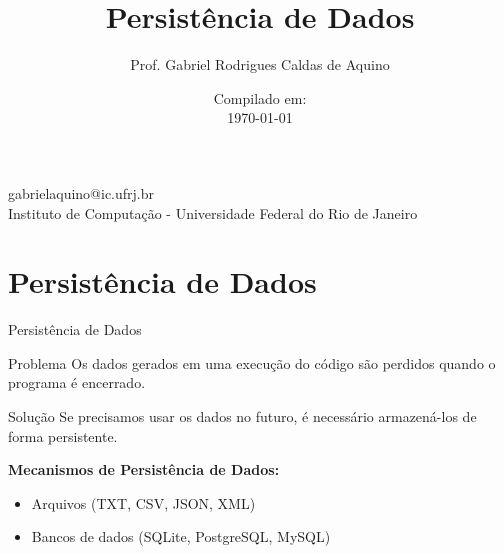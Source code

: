 
\title{Persistência de Dados}

\author{Prof. Gabriel Rodrigues Caldas de Aquino}

\institute
{
    gabrielaquino@ic.ufrj.br\\
    
    Instituto de Computação -
    Universidade Federal do Rio de Janeiro %
}
\date{Compilado em: \\ \today} %


\section{Persistência de Dados}

\begin{frame}
    \titlepage
\end{frame}



\begin{frame}{Persistência de Dados}
    \begin{block}{Problema}
        Os dados gerados em uma execução do código são perdidos quando o programa é encerrado.
    \end{block}
    
    \begin{block}{Solução}
        Se precisamos usar os dados no futuro, é necessário armazená-los de forma persistente.
    \end{block}
    
    \vspace{0.5cm}
    
    \textbf{Mecanismos de Persistência de Dados:}
    \begin{itemize}
        \item Arquivos (TXT, CSV, JSON, XML)
        \item Bancos de dados (SQLite, PostgreSQL, MySQL)
    \end{itemize}
\end{frame}

